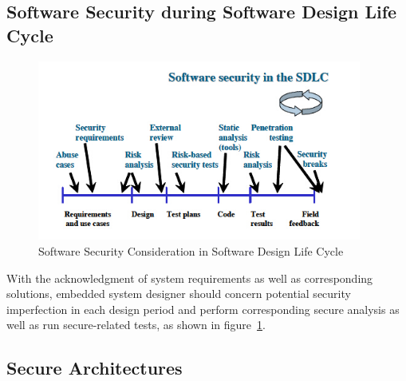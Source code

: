 \subsection{Software Security during Software Design Life Cycle}
\begin{figure}[!htbp]
	\centering
	\includegraphics[width=0.95\textwidth]{sdlc.jpg}
		\caption{Software Security Consideration in Software  Design Life  Cycle\cite{embedded_secure}}
	\label{fig:sdlc}
\end{figure}
With the acknowledgment of system requirements as well as corresponding solutions, embedded system designer should concern potential security imperfection in each design period and perform corresponding secure analysis as well as run secure-related tests, as shown in figure~\ref{fig:sdlc}.
\subsection{Secure Architectures}